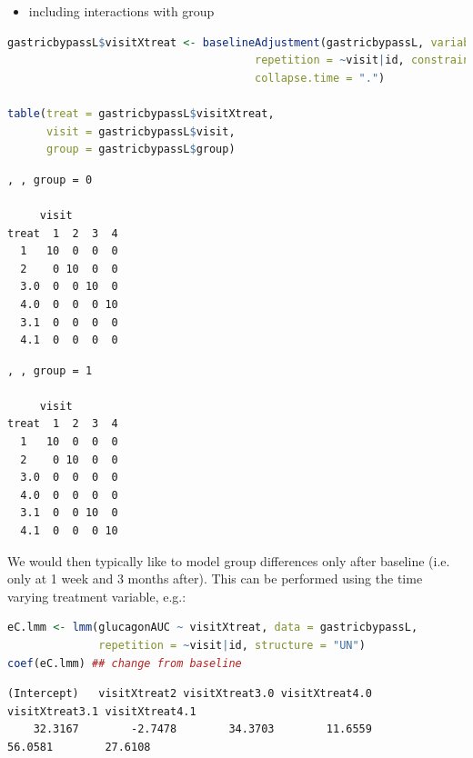 \documentclass[12pt]{article}
\begin{document}
\begin{itemize}
\item including interactions with group
\end{itemize}
\begin{lstlisting}[language=r,numbers=none]
gastricbypassL$visitXtreat <- baselineAdjustment(gastricbypassL, variable = "group",
                                      repetition = ~visit|id, constrain = c("1","2"),
                                      collapse.time = ".")

table(treat = gastricbypassL$visitXtreat,
      visit = gastricbypassL$visit,
      group = gastricbypassL$group)
\end{lstlisting}

\begin{minipage}{0.45\linewidth}
\label{}
\begin{verbatim}
, , group = 0

     visit
treat  1  2  3  4
  1   10  0  0  0
  2    0 10  0  0
  3.0  0  0 10  0
  4.0  0  0  0 10
  3.1  0  0  0  0
  4.1  0  0  0  0
\end{verbatim}
\end{minipage}
\begin{minipage}{0.05\linewidth}
\hphantom{x}
\end{minipage}
\begin{minipage}{0.45\linewidth}
\label{}
\begin{verbatim}
, , group = 1

     visit
treat  1  2  3  4
  1   10  0  0  0
  2    0 10  0  0
  3.0  0  0  0  0
  4.0  0  0  0  0
  3.1  0  0 10  0
  4.1  0  0  0 10
\end{verbatim}

\end{minipage}

We would then typically like to model group differences only after
baseline (i.e. only at 1 week and 3 months after). This can be
performed using the time varying treatment variable, e.g.:
\begin{lstlisting}[language=r,numbers=none]
eC.lmm <- lmm(glucagonAUC ~ visitXtreat, data = gastricbypassL,
              repetition = ~visit|id, structure = "UN")
coef(eC.lmm) ## change from baseline
\end{lstlisting}

\label{}
\begin{verbatim}
(Intercept)   visitXtreat2 visitXtreat3.0 visitXtreat4.0 visitXtreat3.1 visitXtreat4.1 
    32.3167        -2.7478        34.3703        11.6559        56.0581        27.6108
\end{verbatim}
\end{document}
